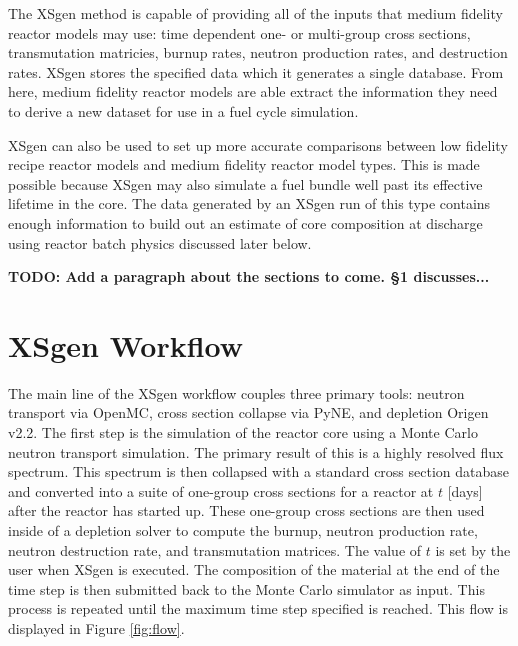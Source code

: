 \documentclass{article}
\newcommand{\TODO}[1] {{\color{red}\textbf{TODO: #1}}}
\begin{document}
The XSgen method is capable of providing all of the inputs that medium fidelity reactor models
may use: time dependent one- or multi-group cross sections, transmutation matricies,
burnup rates, neutron production rates, and destruction rates.
XSgen stores the specified data which it generates a single database.
From here, medium fidelity reactor models are able extract the information they need to
derive a new dataset for use in a fuel cycle simulation.

XSgen can also be used to set up more accurate comparisons between low fidelity recipe reactor
models and medium fidelity reactor model types. This is made possible because XSgen may also
simulate a fuel bundle well past its effective lifetime in the core. The data generated by an
XSgen run of this type contains enough information to build out an estimate of core composition
at discharge using reactor batch physics discussed later below.

\TODO{Add a paragraph about the sections to come. \S 1 discusses...}

\section{XSgen Workflow}
The main line of the XSgen workflow couples three primary tools: neutron transport via OpenMC,
cross section collapse via PyNE, and depletion Origen v2.2. The first step is the simulation
of the reactor core using a Monte Carlo neutron transport simulation. The primary result of
this is a highly resolved flux spectrum. This spectrum is then collapsed with a standard
cross section database and converted into a suite of one-group cross sections for a reactor
at $t$ [days] after the reactor has started up. These one-group cross sections are then used
inside of a depletion solver to compute the burnup, neutron production rate, neutron
destruction rate, and transmutation matrices. The value of $t$ is set by the user when XSgen is executed.
The composition of the material at the end of the time step is then submitted back to
the Monte Carlo simulator as input. This process is repeated until the maximum time
step specified is reached. This flow is displayed in Figure \ref{fig:flow}.
\end{document}

